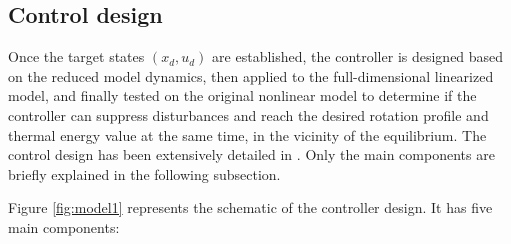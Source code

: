 \documentclass[12pt,lot, lof]{puthesis}
\begin{document}
\subsection{Control design} \label{sec:control_design}

Once the target states $\left( x_{d} , u_{d} \right)$ are established, the controller is designed based on the reduced model dynamics, then applied to the full-dimensional linearized model, and finally tested on the original nonlinear model to determine if the controller can suppress disturbances and reach the desired rotation profile and thermal energy value at the same time, in the vicinity of the equilibrium.
The control design has been extensively detailed in \cite{Goumiri15}. Only the main components are briefly explained in the following subsection. 

Figure \ref{fig:model1} represents the schematic of the controller design. It has five main components:
\end{document}

